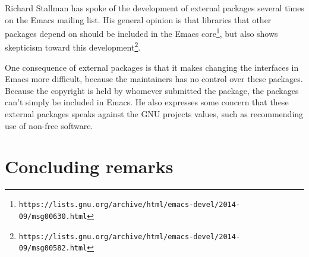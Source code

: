 \documentclass[a4paper,11pt]{article} %
\begin{document}
Richard Stallman has spoke of the development of external packages several
times on the Emacs mailing list. His general opinion is that libraries that
other packages depend on should be included in the Emacs
core\footnote{\texttt{https://lists.gnu.org/archive/html/emacs-devel/2014-09/msg00630.html}},
but also shows skepticism toward this
development\footnote{\texttt{https://lists.gnu.org/archive/html/emacs-devel/2014-09/msg00582.html}}.

One consequence of external packages is that it makes changing the
interfaces in Emacs more difficult, because the maintainers has no control
over these packages. Because the copyright is held by whomever submitted the
package, the packages can't simply be included in Emacs. He also expresses
some concern that these external packages speaks against the GNU projects
values, such as recommending use of non-free software.

\section{Concluding remarks}

\newpage
\printbibliography
\end{document}
